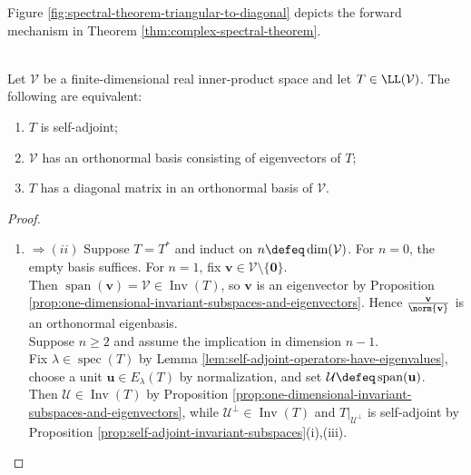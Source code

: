Figure \ref{fig:spectral-theorem-triangular-to-diagonal} depicts the forward mechanism in Theorem \ref{thm:complex-spectral-theorem}.

\begin{illustrationfigure}[H]
  \centering
  
  \caption{Normality turns Schur triangular form into diagonal form by forcing row tails to vanish.}
  \label{fig:spectral-theorem-triangular-to-diagonal}
\end{illustrationfigure}

\begin{theorem} \label{thm:real-spectral-theorem} \\
Let $\mathcal{V}$ be a finite-dimensional real inner-product space and let $T\in\LL(\mathcal{V})$. The following are equivalent:
\begin{enumerate}[label=(\roman*)]
\setlength{\itemsep}{0pt}
\item $T$ is self-adjoint;
\item $\mathcal{V}$ has an orthonormal basis consisting of eigenvectors of $T$;
\item $T$ has a diagonal matrix in an orthonormal basis of $\mathcal{V}$.
\end{enumerate}
\begin{proof}
\begin{enumerate}[label=(\roman*)]
\setlength{\itemsep}{0pt}
\item[$(i)$] $\Rightarrow (ii)$ Suppose $T=T^*$ and induct on $n\defeq\dim(\mathcal{V})$. For $n=0$, the empty basis suffices. For $n=1$, fix $\mathbf{v}\in\mathcal{V}\setminus\{\mathbf{0}\}$.\\
Then $\operatorname{span}(\mathbf{v})=\mathcal{V}\in\operatorname{Inv}(T)$, so $\mathbf{v}$ is an eigenvector by Proposition \ref{prop:one-dimensional-invariant-subspaces-and-eigenvectors}. Hence $\frac{\mathbf{v}}{\norm{\mathbf{v}}}$ is an orthonormal eigenbasis.\\
Suppose $n\geq2$ and assume the implication in dimension $n-1$.\\
Fix $\lambda\in\operatorname{spec}(T)$ by Lemma \ref{lem:self-adjoint-operators-have-eigenvalues}, choose a unit $\mathbf{u}\in E_{\lambda}(T)$ by normalization, and set $\mathcal{U}\defeq\operatorname{span}(\mathbf{u})$.\\
Then $\mathcal{U}\in\operatorname{Inv}(T)$ by Proposition \ref{prop:one-dimensional-invariant-subspaces-and-eigenvectors}, while $\mathcal{U}^{\perp}\in\operatorname{Inv}(T)$ and $T|_{\mathcal{U}^{\perp}}$ is self-adjoint by Proposition \ref{prop:self-adjoint-invariant-subspaces}(i),(iii).\\

\end{enumerate}
\end{proof}
\end{theorem}
